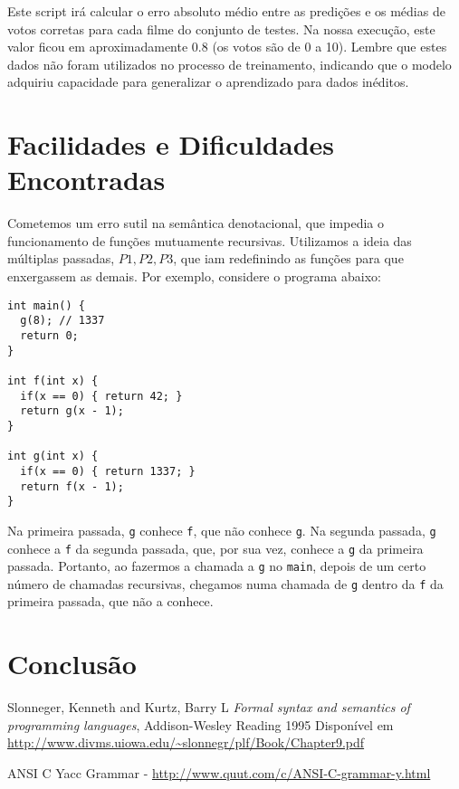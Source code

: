 \documentclass[12pt]{article}
\begin{document}
Este script irá calcular o erro absoluto médio entre as predições e os médias de votos corretas para cada filme do conjunto de testes. Na nossa execução, este valor ficou em aproximadamente 0.8 (os votos são de 0 a 10). Lembre que estes dados não foram utilizados no processo de treinamento, indicando que o modelo adquiriu capacidade para generalizar o aprendizado para dados inéditos.

\section{Facilidades e Dificuldades Encontradas}
Cometemos um erro sutil na semântica denotacional, que impedia o funcionamento de funções mutuamente recursivas. Utilizamos a ideia das múltiplas passadas, $P1, P2, P3$, que iam redefinindo as funções para que enxergassem as demais. Por exemplo, considere o programa abaixo:

\begin{verbatim}
int main() {
  g(8); // 1337
  return 0;
}

int f(int x) {
  if(x == 0) { return 42; }
  return g(x - 1);
}

int g(int x) {
  if(x == 0) { return 1337; }
  return f(x - 1);
}

\end{verbatim}

Na primeira passada, \texttt{g} conhece \texttt{f}, que não conhece \texttt{g}.
Na segunda passada, \texttt{g} conhece a \texttt{f} da segunda passada, que, por sua vez, conhece a \texttt{g} da primeira passada. Portanto, ao fazermos a chamada a \texttt{g} no \texttt{main}, depois de um certo número de chamadas recursivas, chegamos numa chamada de \texttt{g} dentro da \texttt{f} da primeira passada, que não a conhece.

\section{Conclusão}

\begin{thebibliography}{9}
  Slonneger, Kenneth and Kurtz, Barry L
  \textit{Formal syntax and semantics of programming languages},
  Addison-Wesley Reading
  1995
  Disponível em \url{http://www.divms.uiowa.edu/~slonnegr/plf/Book/Chapter9.pdf}

\item ANSI C Yacc Grammar - \url{http://www.quut.com/c/ANSI-C-grammar-y.html}
\end{thebibliography}
	
\end{document}
